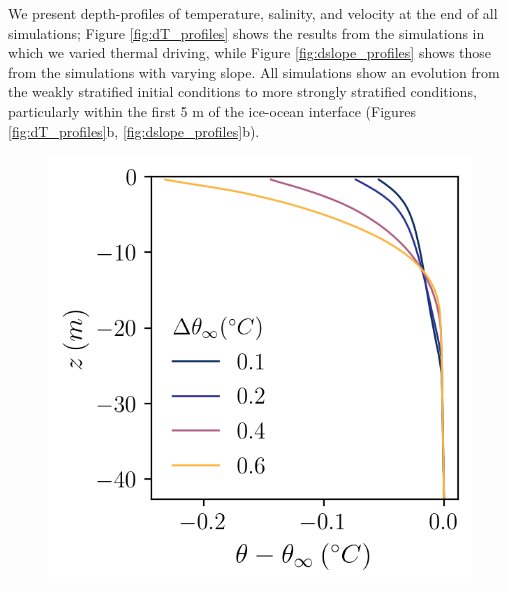 \documentclass[draft]{agujournal2019}
\begin{document}
We present depth-profiles of temperature, salinity, and velocity at the end of all simulations; Figure \ref{fig:dT_profiles} shows the results from the simulations in which we varied thermal driving, while Figure \ref{fig:dslope_profiles} shows those from the simulations with varying slope. All simulations show an evolution from the weakly stratified initial conditions to more strongly stratified conditions, particularly within the first 5 m of the ice-ocean interface (Figures \ref{fig:dT_profiles}b, \ref{fig:dslope_profiles}b). 

\begin{figure}[h!]
    \centering
    \begin{minipage}{0.33\textwidth}
        \includegraphics[trim={0 0cm 0 0},clip, width=\textwidth]{Figures/pt_cmp_dT_43h_tav13h_z_profile.png}
    \end{minipage}%
    \begin{minipage}{0.33\textwidth}

\end{minipage}
\end{figure}
\end{document}
